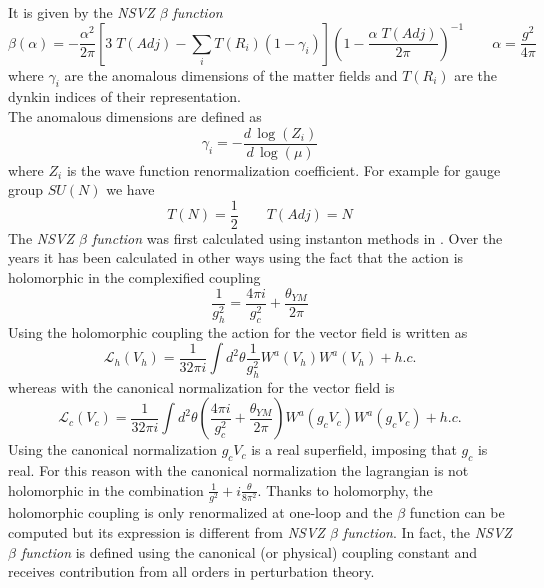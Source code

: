 It is given by the \emph{NSVZ $\beta$ function} 
\begin{equation}
  \beta (\alpha) = - \frac{\alpha^2}{2 \pi} \left[ 3 \; T(Adj) - \sum_i T( R_i) ( 1 - \gamma_i ) \right]  \left( 1 - \frac{ \alpha \; T(Adj)  }{2 \pi} \right)^{-1} \qquad \alpha = \frac{g^2}{4 \pi}
\label{beta-exact}
\end{equation} 
where $\gamma_i$ are the anomalous dimensions of the matter fields and $T(R_i)$ are the dynkin indices of their representation.\\
The anomalous dimensions are defined as
\begin{equation}
 \gamma_i = - \frac{d \, \log(Z_i) }{d \, \log( \mu)}
\end{equation}
where $Z_i$ is the wave function renormalization coefficient.
For example for gauge group $SU(N)$ we have
\begin{equation*}
 T(N) = \frac{1}{2} \qquad T(Adj) = N 
\end{equation*}
The \emph{NSVZ $\beta$ function} was first calculated using instanton methods in \cite{Novikov:1985rd}. 
Over the years it has been calculated in other ways using the fact that the action is holomorphic in the complexified coupling
\begin{equation}
	\frac{1}{g_h^2} = \frac{4 \pi i }{g_c^2 } + \frac{\theta_{YM}}{2 \pi} 
\end{equation}
Using the holomorphic coupling the action for the vector field is written as
\begin{equation}
 \mathcal{L}_h ( V_h) = \frac{1}{32 \pi i } \int d^2 \theta \frac{1}{g_h^2} W^a ( V_h) W^a(V_h)  + h.c.
\end{equation}
whereas with the canonical normalization for the vector field is
\begin{equation}
 \mathcal{L}_c ( V_c) = \frac{1}{32 \pi i } \int d^2 \theta \left( \frac{4 \pi i }{g_c^2 } + \frac{\theta_{YM}}{2 \pi} \right) W^a ( g_c V_c) W^a(g_c V_c) + h. c.  
\end{equation}
Using the canonical normalization $g_c V_c$ is a real superfield, imposing that $g_c$ is real. For this reason with the canonical normalization the lagrangian is not holomorphic in the combination $ \frac{1}{g^2 } + i \frac{\theta}{8 \pi^2} $.
Thanks to holomorphy, the holomorphic coupling is only renormalized at one-loop and the $\beta$ function can be computed but its expression is different from \emph{NSVZ $\beta$ function}.
In fact, the \emph{NSVZ $\beta$ function} is defined using the canonical (or physical) coupling constant and receives contribution from all orders in perturbation theory.

